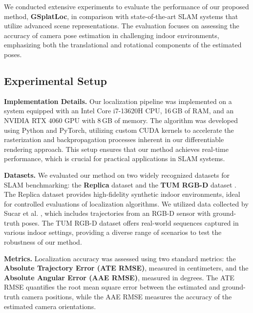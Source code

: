 \documentclass[twocolumn]{article} %
\begin{document}
We conducted extensive experiments to evaluate the performance of our
proposed method, \textbf{GSplatLoc}, in comparison with state-of-the-art
SLAM systems that utilize advanced scene representations. The evaluation
focuses on assessing the accuracy of camera pose estimation in
challenging indoor environments, emphasizing both the translational and
rotational components of the estimated poses.

\subsection{Experimental Setup}\label{experimental-setup}

\textbf{Implementation Details.} Our localization pipeline was
implemented on a system equipped with an Intel Core i7-13620H CPU,
16\,GB of RAM, and an NVIDIA RTX 4060 GPU with 8\,GB of memory. The
algorithm was developed using Python and PyTorch, utilizing custom CUDA
kernels to accelerate the rasterization and backpropagation processes
inherent in our differentiable rendering approach. This setup ensures
that our method achieves real-time performance, which is crucial for
practical applications in SLAM systems.

\textbf{Datasets.} We evaluated our method on two widely recognized
datasets for SLAM benchmarking: the \textbf{Replica} dataset
\cite{straubReplicaDatasetDigital2019} and the \textbf{TUM RGB-D}
dataset \cite{sturmBenchmarkEvaluationRGBD2012}. The Replica dataset
provides high-fidelity synthetic indoor environments, ideal for
controlled evaluations of localization algorithms. We utilized data
collected by Sucar et al. \cite{sucarImapImplicitMapping2021}, which
includes trajectories from an RGB-D sensor with ground-truth poses. The
TUM RGB-D dataset offers real-world sequences captured in various indoor
settings, providing a diverse range of scenarios to test the robustness
of our method.

\textbf{Metrics.} Localization accuracy was assessed using two standard
metrics: the \textbf{Absolute Trajectory Error (ATE RMSE)}, measured in
centimeters, and the \textbf{Absolute Angular Error (AAE RMSE)},
measured in degrees. The ATE RMSE quantifies the root mean square error
between the estimated and ground-truth camera positions, while the AAE
RMSE measures the accuracy of the estimated camera orientations.
\end{document}
